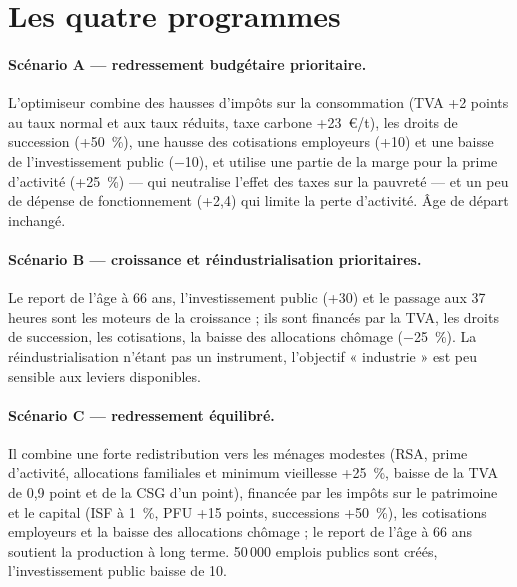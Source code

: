 \section{Les quatre programmes}

\begin{table}[htbp]
\centering\small
\caption{Leviers retenus par l'optimisation (valeur du curseur ; « -- » : inchangé). La colonne R, programme recommandé, est présentée au
chapitre~\ref{ch:synthese}.}
\label{tab:scmesures}
\end{table}

\paragraph{Scénario A — redressement budgétaire prioritaire.} L'optimiseur combine des hausses d'impôts sur la
consommation (TVA +2 points au taux normal et aux taux réduits, taxe carbone +23~€/t), les droits de succession (+50~\%),
une hausse des cotisations employeurs (+10\md) et une baisse de l'investissement public ($-$10\md), et utilise une partie
de la marge pour la prime d'activité (+25~\%) — qui neutralise l'effet des taxes sur la pauvreté — et un peu de
dépense de fonctionnement (+2,4\md) qui limite la perte d'activité. Âge de départ inchangé.

\paragraph{Scénario B — croissance et réindustrialisation prioritaires.} Le report de l'âge à 66 ans, l'investissement
public (+30\md) et le passage aux 37 heures sont les moteurs de la croissance ; ils sont financés par la TVA, les droits
de succession, les cotisations, la baisse des allocations chômage ($-$25~\%). La réindustrialisation n'étant pas un
instrument, l'objectif « industrie » est peu sensible aux leviers disponibles.

\paragraph{Scénario C — redressement équilibré.} Il combine une forte redistribution vers les ménages modestes (RSA,
prime d'activité, allocations familiales et minimum vieillesse +25~\%, baisse de la TVA de 0,9 point et de la CSG d'un
point), financée par les impôts sur le patrimoine et le capital (ISF à 1~\%, PFU +15 points, successions +50~\%), les
cotisations employeurs et la baisse des allocations chômage ; le report de l'âge à 66 ans soutient la production à long
terme. 50\,000 emplois publics sont créés, l'investissement public baisse de 10\md.

